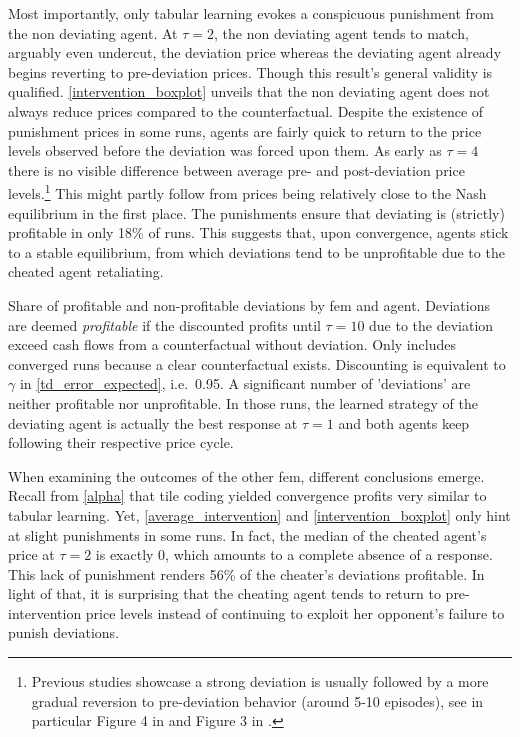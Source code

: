 Most importantly, only tabular learning evokes a conspicuous punishment from the non deviating agent. At $\tau = 2$, the non deviating agent tends to match, arguably even undercut, the deviation price whereas the deviating agent already begins reverting to pre-deviation prices. Though this result's general validity is qualified. \autoref{intervention_boxplot} unveils that the non deviating agent does not always reduce prices compared to the counterfactual. Despite the existence of punishment prices in some runs, agents are fairly quick to return to the price levels observed before the deviation was forced upon them. As early as $\tau = 4$ there is no visible difference between average pre- and post-deviation price levels.\footnote{Previous studies showcase a strong deviation is usually followed by a more gradual reversion to pre-deviation behavior (around 5-10 episodes), see in particular Figure 4 in \textcite{calvano_algorithmic_2018} and Figure 3 in \textcite{klein_autonomous_2019}.} This might partly follow from prices being relatively close to the Nash equilibrium in the first place. The punishments ensure that deviating is (strictly) profitable in only 18\% of runs. This suggests that, upon convergence, agents stick to a stable equilibrium, from which deviations tend to be unprofitable due to the cheated agent retaliating.


	\begin{table}
		\centering
		
		\caption[Share of profitable deviations by \gls{fem} and agent]{Share of profitable and non-profitable deviations by \gls{fem} and agent. Deviations are deemed \emph{profitable} if the discounted profits until $\tau = 10$ due to the deviation exceed cash flows from a counterfactual without deviation. Only includes converged runs because a clear counterfactual exists. Discounting is equivalent to $\gamma$ in \autoref{td_error_expected}, i.e.\ 0.95. A significant number of 'deviations' are neither profitable nor unprofitable. In those runs, the learned strategy of the deviating agent is actually the best response at $\tau = 1$ and both agents keep following their respective price cycle.}
		\label{share_deviation_profitability}
	\end{table}

When examining the outcomes of the other \gls{fem}, different conclusions emerge. Recall from \autoref{alpha} that tile coding yielded convergence profits very similar to tabular learning. Yet, \autoref{average_intervention} and \autoref{intervention_boxplot} only hint at slight punishments in some runs. In fact, the median of the cheated agent's price at $\tau = 2$ is exactly 0, which amounts to a complete absence of a response. This lack of punishment renders 56\% of the cheater's deviations profitable. In light of that, it is surprising that the cheating agent tends to return to pre-intervention price levels instead of continuing to exploit her opponent's failure to punish deviations.


